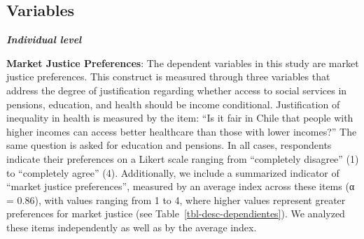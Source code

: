 \documentclass[
  12pt,
  letterpaper,
]{article}
\begin{document}
\subsection{Variables}\label{variables}

\textbf{\emph{Individual level}}

\textbf{Market Justice Preferences}: The dependent variables in this
study are market justice preferences. This construct is measured through
three variables that address the degree of justification regarding
whether access to social services in pensions, education, and health
should be income conditional. Justification of inequality in health is
measured by the item: ``Is it fair in Chile that people with higher
incomes can access better healthcare than those with lower incomes?''
The same question is asked for education and pensions. In all cases,
respondents indicate their preferences on a Likert scale ranging from
``completely disagree'' (1) to ``completely agree'' (4). Additionally,
we include a summarized indicator of ``market justice preferences'',
measured by an average index across these items (α = 0.86), with values
ranging from 1 to 4, where higher values represent greater preferences
for market justice (see Table~\ref{tbl-desc-dependientes}). We analyzed
these items independently as well as by the average index.
\end{document}
